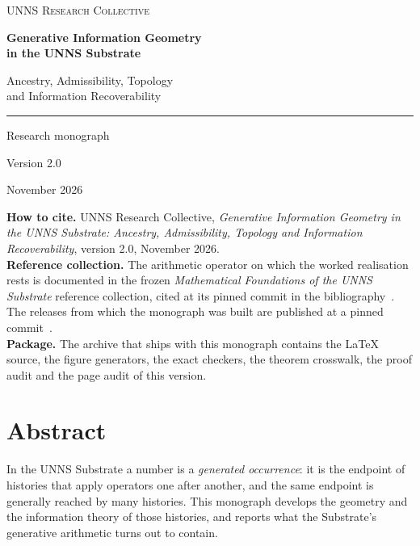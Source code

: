 
\frontmatter
\begin{titlepage}
\centering
\vspace*{1.2cm}
{\large\scshape UNNS Research Collective\par}
\vspace{1.5cm}
{\fontsize{26}{31}\selectfont\bfseries Generative Information Geometry\\[0.25em] in the UNNS Substrate\par}
\vspace{0.7cm}
{\Large Ancestry, Admissibility, Topology\\ and Information Recoverability\par}
\vspace{1.4cm}
{\color{accent}\rule{0.45\textwidth}{0.8pt}}\par
\vspace{0.6cm}
{\large Research monograph\par}
{\large Version 2.0\par}
{\large November 2026\par}
\vfill
\begin{minipage}{0.88\textwidth}\small\raggedright
\textbf{How to cite.} UNNS Research Collective, \emph{Generative Information Geometry in the UNNS Substrate: Ancestry, Admissibility, Topology and Information Recoverability}, version 2.0, November 2026.\\[0.5em]
\textbf{Reference collection.} The arithmetic operator on which the worked realisation rests is documented in the frozen \emph{Mathematical Foundations of the UNNS Substrate} reference collection, cited at its pinned commit in the bibliography~\cite{UNNSFound}. The releases from which the monograph was built are published at a pinned commit~\cite{UNNSGIG}.\\[0.5em]
\textbf{Package.} The archive that ships with this monograph contains the \LaTeX{} source, the figure generators, the exact checkers, the theorem crosswalk, the proof audit and the page audit of this version.
\end{minipage}
\end{titlepage}
\chapter*{Abstract}
In the UNNS Substrate a number is a \emph{generated occurrence}: it is the endpoint of histories that apply operators one after another, and the same endpoint is generally reached by many histories. This monograph develops the geometry and the information theory of those histories, and reports what the Substrate's generative arithmetic turns out to contain.

